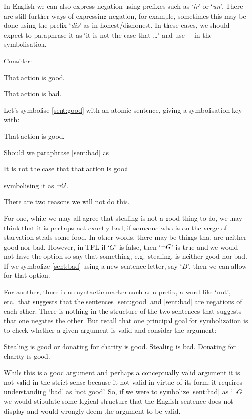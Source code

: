 In English we can also express negation using prefixes such as `\emph{ir}' or `\emph{un}'. There are still further ways of expressing negation, for example, sometimes this may be done using  the prefix `\emph{dis}' as in honest/dishonest. In these cases, we should expect to paraphrase it as `it is not the case that \ldots' and use $\neg$ in the symbolisation. 

Consider:
\begin{samplesent}
	\item\label{sent:good} That action is good.
	\item\label{sent:bad} That action is bad.
\end{samplesent}
Let's symbolise \cref{sent:good} with an atomic sentence, giving a symbolisation key with:
\begin{ekey}
	\item[G] That action is good.
\end{ekey}
Should we paraphrase \cref{sent:bad} as 
\begin{samplesent}
	\item It is not the case that \underline{that action is good}
\end{samplesent}
symbolising it as $\neg G$. 

There are two reasons we will not do this. 

For one, while we may all agree that stealing is not a good thing to do, we may think that it is perhaps not exactly bad, if someone who is on the verge of starvation steals some food. In other words, there may be things that are neither good nor bad. However,  in TFL if `$G$' is false, then `$\neg G$' is true and we would not have the option so say that something, e.g.~stealing, is neither good nor bad. If we symbolize \cref{sent:bad} using a new sentence letter, say `$B$', then we can allow for that option. 

For another, there is no syntactic marker such as a prefix, a word like `not', etc.~that suggests that the sentences \cref{sent:good} and \cref{sent:bad} are negations of each other. There is nothing in the structure of the two sentences that suggests that one negates the other.  But recall that one principal goal for symbolization is to check whether a given argument is valid and consider the argument:
\begin{earg}
	\prem Stealing is good or donating for charity is good.
	\prem Stealing is bad.
	\conc Donating for charity is good.
\end{earg}
While this is a good argument and perhaps a conceptually valid argument it is not valid in the strict sense because it not valid in virtue of its form: it requires understanding `bad' as `not good'. So, if we were to symbolize \cref{sent:bad} as `$\neg G$ we would stipulate some logical structure that the English sentence does not display and would wrongly deem the argument to be valid.

